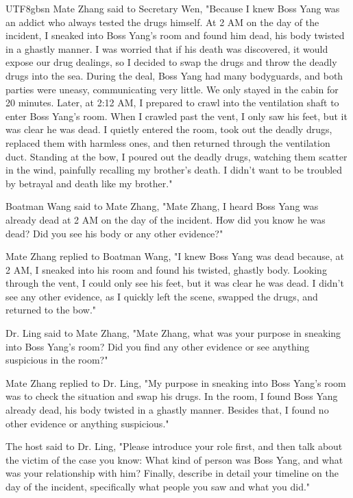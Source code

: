 \documentclass[11pt]{article}
\begin{document}
{\begin{CJK}{UTF8}{gbsn}
Mate Zhang said to Secretary Wen, "Because I knew Boss Yang was an addict who always tested the drugs himself. At 2 AM on the day of the incident, I sneaked into Boss Yang's room and found him dead, his body twisted in a ghastly manner. I was worried that if his death was discovered, it would expose our drug dealings, so I decided to swap the drugs and throw the deadly drugs into the sea. During the deal, Boss Yang had many bodyguards, and both parties were uneasy, communicating very little. We only stayed in the cabin for 20 minutes. Later, at 2:12 AM, I prepared to crawl into the ventilation shaft to enter Boss Yang's room. When I crawled past the vent, I only saw his feet, but it was clear he was dead. I quietly entered the room, took out the deadly drugs, replaced them with harmless ones, and then returned through the ventilation duct. Standing at the bow, I poured out the deadly drugs, watching them scatter in the wind, painfully recalling my brother's death. I didn't want to be troubled by betrayal and death like my brother."

Boatman Wang said to Mate Zhang, "Mate Zhang, I heard Boss Yang was already dead at 2 AM on the day of the incident. How did you know he was dead? Did you see his body or any other evidence?"

Mate Zhang replied to Boatman Wang, "I knew Boss Yang was dead because, at 2 AM, I sneaked into his room and found his twisted, ghastly body. Looking through the vent, I could only see his feet, but it was clear he was dead. I didn't see any other evidence, as I quickly left the scene, swapped the drugs, and returned to the bow."

Dr. Ling said to Mate Zhang, "Mate Zhang, what was your purpose in sneaking into Boss Yang's room? Did you find any other evidence or see anything suspicious in the room?"

Mate Zhang replied to Dr. Ling, "My purpose in sneaking into Boss Yang's room was to check the situation and swap his drugs. In the room, I found Boss Yang already dead, his body twisted in a ghastly manner. Besides that, I found no other evidence or anything suspicious."

The host said to Dr. Ling, "Please introduce your role first, and then talk about the victim of the case you know: What kind of person was Boss Yang, and what was your relationship with him? Finally, describe in detail your timeline on the day of the incident, specifically what people you saw and what you did."


\end{CJK}}
\end{document}
